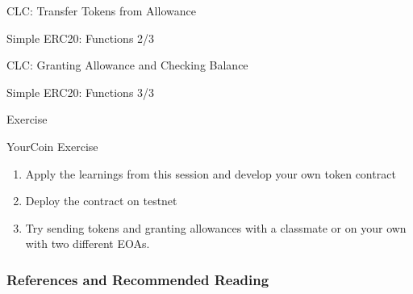 \documentclass[handout]{beamer}
\begin{document}
\begin{frame}{CLC: Transfer Tokens from Allowance}

	\begin{samplecode}{Simple ERC20: Functions 2/3}
		
	\end{samplecode}

\end{frame}

\begin{frame}{CLC: Granting Allowance and Checking Balance}

	\begin{samplecode}{Simple ERC20: Functions 3/3}
		
	\end{samplecode}

\end{frame}


\begin{frame}{Exercise}

\begin{exercise}{YourCoin Exercise}
\begin{enumerate}
	\item	Apply the learnings from this session and develop your own token contract
	\item	Deploy the contract on testnet
	\item 	Try sending tokens and granting allowances with a classmate or on your own with two different EOAs.
\end{enumerate}
\end{exercise}					

\end{frame}


\begin{frame}%
\frametitle{References and Recommended Reading}
	
	
\end{frame}
\end{document}
